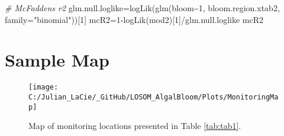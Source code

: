 \documentclass[]{interact}
\theoremstyle{plain}%
\theoremstyle{definition}
\theoremstyle{remark}
\newenvironment{Shaded}{\begin{snugshade}}{\end{snugshade}}
\newcommand{\AttributeTok}[1]{\textcolor[rgb]{0.77,0.63,0.00}{#1}}
\newcommand{\CommentTok}[1]{\textcolor[rgb]{0.56,0.35,0.01}{\textit{#1}}}
\newcommand{\DecValTok}[1]{\textcolor[rgb]{0.00,0.00,0.81}{#1}}
\newcommand{\FunctionTok}[1]{\textcolor[rgb]{0.00,0.00,0.00}{#1}}
\newcommand{\NormalTok}[1]{#1}
\newcommand{\OtherTok}[1]{\textcolor[rgb]{0.56,0.35,0.01}{#1}}
\newcommand{\SpecialCharTok}[1]{\textcolor[rgb]{0.00,0.00,0.00}{#1}}
\newcommand{\StringTok}[1]{\textcolor[rgb]{0.31,0.60,0.02}{#1}}
\begin{document}
\begin{Shaded}
\begin{Highlighting}[]
\CommentTok{\# McFadden\textquotesingle{}s r2}
\NormalTok{glm.null.loglike}\OtherTok{=}\FunctionTok{logLik}\NormalTok{(}\FunctionTok{glm}\NormalTok{(bloom}\SpecialCharTok{\textasciitilde{}}\DecValTok{1}\NormalTok{,}
\NormalTok{                            bloom.region.xtab2,}
                            \AttributeTok{family=}\StringTok{"binomial"}\NormalTok{))[}\DecValTok{1}\NormalTok{]}
\NormalTok{mcR2}\OtherTok{=}\DecValTok{1}\SpecialCharTok{{-}}\FunctionTok{logLik}\NormalTok{(mod2)[}\DecValTok{1}\NormalTok{]}\SpecialCharTok{/}\NormalTok{glm.null.loglike}
\NormalTok{mcR2}
\end{Highlighting}
\end{Shaded}

\newpage
\section{Sample Map}

\begin{figure}[H]

{\centering \texttt{[image: C:/Julian\_LaCie/\_GitHub/LOSOM\_AlgalBloom/Plots/MonitoringMap]} 

}

\caption{\label{fig:map}Map of monitoring locations presented in Table \ref{tab:tab1}.}\label{fig:unnamed-chunk-13}
\end{figure}

\newpage



\end{document}
